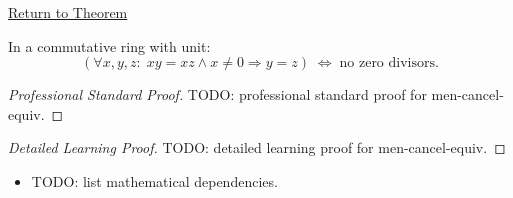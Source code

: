 \newpage
{}
\label{prf:men-cancel-equiv}

\begin{remark*}[Return]
\hyperref[thm:men-cancel-equiv]{Return to Theorem}
\end{remark*}

\begin{theorem*}
In a commutative ring with unit:
\[
(\forall x,y,z:\; xy=xz \wedge x\neq 0 \Rightarrow y=z)
\;\Longleftrightarrow\;
\text{no zero divisors.}
\]
\end{theorem*}

\begin{proof}[Professional Standard Proof]
\LRAProofBodyStart
TODO: professional standard proof for men-cancel-equiv.
\end{proof}

\begin{proof}[Detailed Learning Proof]
\LRAProofBodyStart
TODO: detailed learning proof for men-cancel-equiv.
\end{proof}

\begin{remark*}
\end{remark*}

\begin{dependencies}
\begin{itemize}
  \item TODO: list mathematical dependencies.
\end{itemize}
\end{dependencies}

\clearpage
